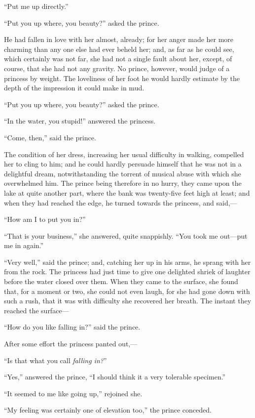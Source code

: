 \documentclass[12pt]{memoir}
\begin{document}
``Put me up directly.''

``Put you up where, you beauty?'' asked the prince.

He had fallen in love with her almost, already; for her anger made her
more charming than any one else had ever beheld her; and, as far as he
could see, which certainly was not far, she had not a single fault
about her, except, of course, that she had not any gravity.  No
prince, however, would judge of a princess by weight.  The loveliness
of her foot he would hardly estimate by the depth of the impression it
could make in mud.

``Put you up where, you beauty?'' asked the prince.

``In the water, you stupid!'' answered the princess.

``Come, then,'' said the prince.

The condition of her dress, increasing her usual difficulty in
walking, compelled her to cling to him; and he could hardly persuade
himself that he was not in a delightful dream, notwithstanding the
torrent of musical abuse with which she overwhelmed him.  The prince
being therefore in no hurry, they came upon the lake at quite another
part, where the bank was twenty-five feet high at least; and when they
had reached the edge, he turned towards the princess, and said,---

``How am I to put you in?''

``That is your business,'' she answered, quite snappishly.  ``You took
me out---put me in again.''

``Very well,'' said the prince; and, catching her up in his arms, he
sprang with her from the rock.  The princess had just time to give one
delighted shriek of laughter before the water closed over them.  When
they came to the surface, she found that, for a moment or two, she
could not even laugh, for she had gone down with such a rush, that it
was with difficulty she recovered her breath.  The instant they
reached the surface---

``How do you like falling in?'' said the prince.

After some effort the princess panted out,---

``Is that what you call \emph{falling in?}''

``Yes,'' answered the prince, ``I should think it a very tolerable
specimen.''

``It seemed to me like going up,'' rejoined she.

``My feeling was certainly one of elevation too,'' the prince
conceded.
\end{document}
